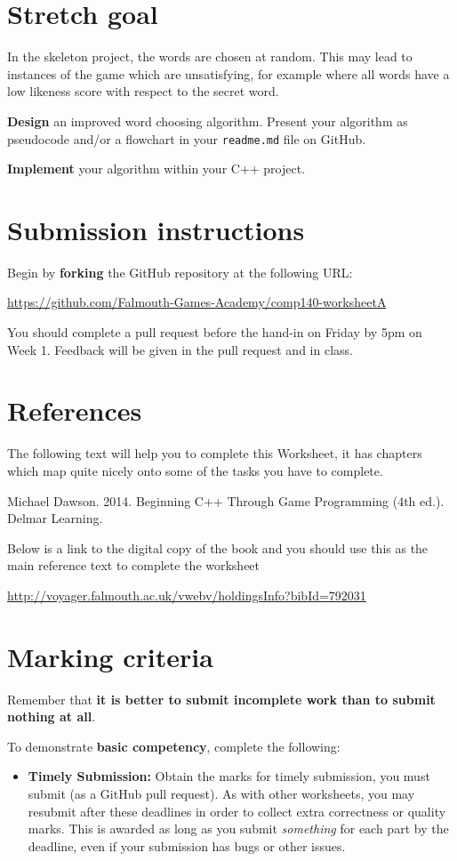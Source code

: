 \documentclass{../../../fal_assignment}
\begin{document}
\section{Stretch goal} \label{stretch-a}

In the skeleton project, the words are chosen at random.
This may lead to instances of the game which are unsatisfying, for example where all words
have a low likeness score with respect to the secret word.

\textbf{Design} an improved word choosing algorithm.
Present your algorithm as pseudocode and/or a flowchart in your \texttt{readme.md} file on GitHub.

\textbf{Implement} your algorithm within your C++ project.

\section*{Submission instructions}

Begin by \textbf{forking} the GitHub repository at the following URL:

\url{https://github.com/Falmouth-Games-Academy/comp140-worksheetA}

You should complete a pull request before the hand-in on Friday by 5pm on Week 1. Feedback will be given in the pull request and in class.

\section*{References}
The following text will help you to complete this Worksheet, it has chapters which map quite nicely onto some of the tasks you have to complete.

Michael Dawson. 2014. Beginning C++ Through Game Programming (4th ed.). Delmar Learning. 

Below is a link to the digital copy of the book and you should use this as the main reference text to complete the worksheet

\url{http://voyager.falmouth.ac.uk/vwebv/holdingsInfo?bibId=792031}

\section*{Marking criteria}

Remember that \textbf{it is better to submit incomplete work than to submit nothing at all}. 

To demonstrate \textbf{basic competency}, complete the following:
\begin{itemize}
	\item \textbf{Timely Submission:} Obtain the marks for timely submission, you must submit (as a GitHub pull request).
	As with other worksheets, you may resubmit after these deadlines in order to collect extra correctness or quality marks.
	This is awarded as long as you submit \emph{something} for each part by the deadline,
	even if your submission has bugs or other issues.
\end{itemize} 
\end{document}
